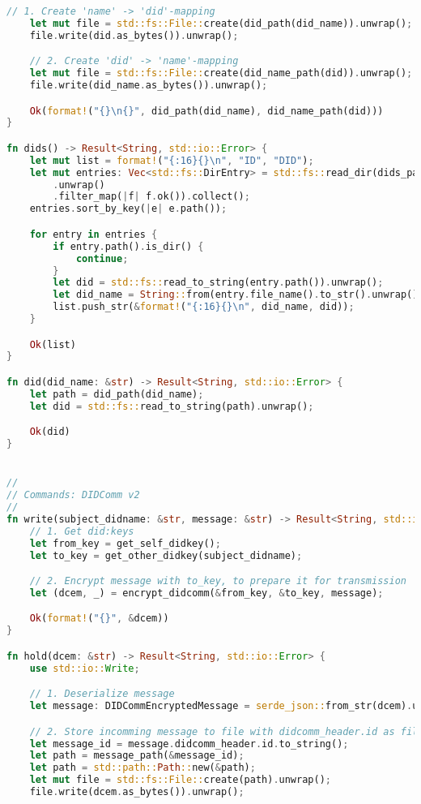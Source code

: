 \begin{lstlisting}[language=Rust]
    // 1. Create 'name' -> 'did'-mapping
    let mut file = std::fs::File::create(did_path(did_name)).unwrap();
    file.write(did.as_bytes()).unwrap();

    // 2. Create 'did' -> 'name'-mapping
    let mut file = std::fs::File::create(did_name_path(did)).unwrap();
    file.write(did_name.as_bytes()).unwrap();

    Ok(format!("{}\n{}", did_path(did_name), did_name_path(did)))
}

fn dids() -> Result<String, std::io::Error> {
    let mut list = format!("{:16}{}\n", "ID", "DID");
    let mut entries: Vec<std::fs::DirEntry> = std::fs::read_dir(dids_path())
        .unwrap()
        .filter_map(|f| f.ok()).collect();
    entries.sort_by_key(|e| e.path());

    for entry in entries {
        if entry.path().is_dir() {
            continue;
        }
        let did = std::fs::read_to_string(entry.path()).unwrap();
        let did_name = String::from(entry.file_name().to_str().unwrap()).replace(".did", "");
        list.push_str(&format!("{:16}{}\n", did_name, did));
    }

    Ok(list)
}

fn did(did_name: &str) -> Result<String, std::io::Error> {
    let path = did_path(did_name);
    let did = std::fs::read_to_string(path).unwrap();

    Ok(did)
}


//
// Commands: DIDComm v2
//
fn write(subject_didname: &str, message: &str) -> Result<String, std::io::Error> {
    // 1. Get did:keys
    let from_key = get_self_didkey();
    let to_key = get_other_didkey(subject_didname);

    // 2. Encrypt message with to_key, to prepare it for transmission
    let (dcem, _) = encrypt_didcomm(&from_key, &to_key, message);

    Ok(format!("{}", &dcem))
}

fn hold(dcem: &str) -> Result<String, std::io::Error> {
    use std::io::Write;

    // 1. Deserialize message
    let message: DIDCommEncryptedMessage = serde_json::from_str(dcem).unwrap();

    // 2. Store incomming message to file with didcomm_header.id as filename.
    let message_id = message.didcomm_header.id.to_string();
    let path = message_path(&message_id);
    let path = std::path::Path::new(&path);
    let mut file = std::fs::File::create(path).unwrap();
    file.write(dcem.as_bytes()).unwrap();


\end{lstlisting}
